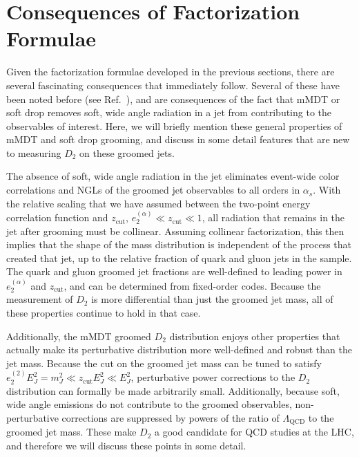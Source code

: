 \documentclass[a4paper,11pt]{article}
\newcommand{\ecf}[2]{e_{#1}^{(#2)}}
\def\zcut{z_{\text{cut}}}
\DeclareRobustCommand{\Ref}[1]{Ref.~\cite{#1}}
\begin{document}
\section{Consequences of Factorization Formulae}\label{sec:consfact}



Given the factorization formulae developed in the previous sections, there are several fascinating consequences that immediately follow.  Several of these have been noted before (see \Ref{Frye:2016aiz}), and are consequences of the fact that mMDT or soft drop removes soft, wide angle radiation in a jet from contributing to the observables of interest.  Here, we will briefly mention these general properties of mMDT and soft drop grooming, and discuss in some detail features that are new to measuring $D_2$ on these groomed jets.

The absence of soft, wide angle radiation in the jet eliminates event-wide color correlations and NGLs of the groomed jet observables to all orders in $\alpha_s$.  With the relative scaling that we have assumed between the two-point energy correlation function and $\zcut$, $\ecf{2}{\alpha}\ll \zcut \ll 1$, all radiation that remains in the jet after grooming must be collinear.  Assuming collinear factorization, this then implies that the shape of the mass distribution is independent of the process that created that jet, up to the relative fraction of quark and gluon jets in the sample.  The quark and gluon groomed jet fractions are well-defined to leading power in $\ecf{2}{\alpha}$ and $\zcut$, and can be determined from fixed-order codes.  Because the measurement of $D_2$ is more differential than just the groomed jet mass, all of these properties continue to hold in that case.

Additionally, the mMDT groomed $D_2$ distribution enjoys other properties that actually make its perturbative distribution more well-defined and robust than the jet mass.  Because the cut on the groomed jet mass can be tuned to satisfy $\ecf{2}{2} E_J^2 = m_J^2 \ll \zcut E_J^2\ll E_J^2$, perturbative power corrections to the $D_2$ distribution can formally be made arbitrarily small.  Additionally, because soft, wide angle emissions do not contribute to the groomed observables, non-perturbative corrections are suppressed by powers of the ratio of $\Lambda_\text{QCD}$ to the groomed jet mass.  These make $D_2$ a good candidate for QCD studies at the LHC, and therefore we will discuss these points in some detail.
\end{document}
